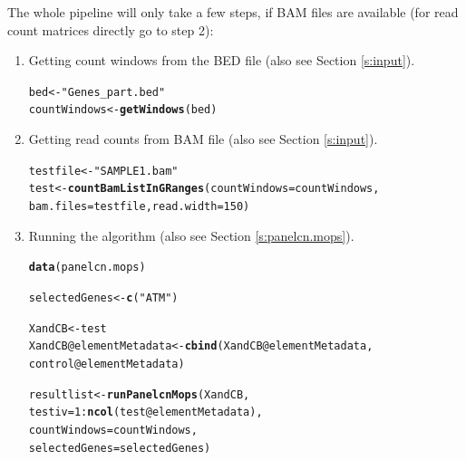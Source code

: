 \documentclass[article]{bioinf}\usepackage[]{graphicx}\usepackage[]{color}
\makeatletter
\newcommand{\hlnum}[1]{\textcolor[rgb]{0.686,0.059,0.569}{#1}}%
\newcommand{\hlstr}[1]{\textcolor[rgb]{0.192,0.494,0.8}{#1}}%
\newcommand{\hlopt}[1]{\textcolor[rgb]{0,0,0}{#1}}%
\newcommand{\hlstd}[1]{\textcolor[rgb]{0.345,0.345,0.345}{#1}}%
\newcommand{\hlkwb}[1]{\textcolor[rgb]{0.69,0.353,0.396}{#1}}%
\newcommand{\hlkwc}[1]{\textcolor[rgb]{0.333,0.667,0.333}{#1}}%
\newcommand{\hlkwd}[1]{\textcolor[rgb]{0.737,0.353,0.396}{\textbf{#1}}}%
\newenvironment{kframe}{%
 \def\at@end@of@kframe{}%
 \ifinner\ifhmode%
  \def\at@end@of@kframe{\end{minipage}}%
  \begin{minipage}{\columnwidth}%
 \fi\fi%
 \def\FrameCommand##1{\hskip\@totalleftmargin \hskip-\fboxsep
 \colorbox{shadecolor}{##1}\hskip-\fboxsep
     \hskip-\linewidth \hskip-\@totalleftmargin \hskip\columnwidth}%
 \MakeFramed {\advance\hsize-\width
   \@totalleftmargin\z@ \linewidth\hsize
   \@setminipage}}%
 {\par\unskip\endMakeFramed%
 \at@end@of@kframe}
\newenvironment{knitrout}{}{} %
\makeatother
\begin{document}
The whole pipeline will only take a few steps, if BAM files are available
(for read count matrices directly go to step 2):

\begin{enumerate}
\item Getting count windows from the BED file (also see Section \ref{s:input}).
\begin{knitrout}
\color{fgcolor}\begin{kframe}
\begin{alltt}
\hlstd{bed} \hlkwb{<-} \hlstr{"Genes_part.bed"}
\hlstd{countWindows} \hlkwb{<-} \hlkwd{getWindows}\hlstd{(bed)}
\end{alltt}
\end{kframe}
\end{knitrout}

\item Getting read counts from BAM file (also see Section \ref{s:input}).
\begin{knitrout}
\color{fgcolor}\begin{kframe}
\begin{alltt}
\hlstd{testfile} \hlkwb{<-} \hlstr{"SAMPLE1.bam"}
\hlstd{test} \hlkwb{<-} \hlkwd{countBamListInGRanges}\hlstd{(}\hlkwc{countWindows} \hlstd{= countWindows,}
                              \hlkwc{bam.files} \hlstd{= testfile,} \hlkwc{read.width} \hlstd{=} \hlnum{150}\hlstd{)}
\end{alltt}
\end{kframe}
\end{knitrout}

\item Running the algorithm (also see Section \ref{s:panelcn.mops}).
\begin{knitrout}
\color{fgcolor}\begin{kframe}
\begin{alltt}
\hlkwd{data}\hlstd{(panelcn.mops)}

\hlstd{selectedGenes} \hlkwb{<-} \hlkwd{c}\hlstd{(}\hlstr{"ATM"}\hlstd{)}

\hlstd{XandCB} \hlkwb{<-} \hlstd{test}
\hlstd{XandCB}\hlopt{@}\hlkwc{elementMetadata} \hlkwb{<-} \hlkwd{cbind}\hlstd{(XandCB}\hlopt{@}\hlkwc{elementMetadata}\hlstd{,}
                                \hlstd{control}\hlopt{@}\hlkwc{elementMetadata}\hlstd{)}

\hlstd{resultlist} \hlkwb{<-} \hlkwd{runPanelcnMops}\hlstd{(XandCB,}
                             \hlkwc{testiv} \hlstd{=} \hlnum{1}\hlopt{:}\hlkwd{ncol}\hlstd{(test}\hlopt{@}\hlkwc{elementMetadata}\hlstd{),}
                             \hlkwc{countWindows} \hlstd{= countWindows,}
                             \hlkwc{selectedGenes} \hlstd{= selectedGenes)}
\end{alltt}
\end{kframe}
\end{knitrout}


\end{enumerate}
\end{document}
